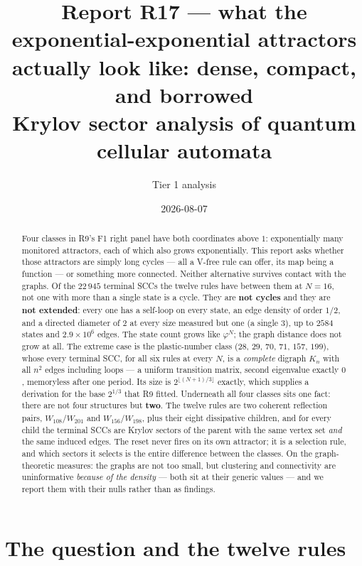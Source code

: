 \documentclass[11pt]{article}
\title{\textbf{Report R17 --- what the exponential-exponential attractors
actually look like: dense, compact, and borrowed}\\
\large Krylov sector analysis of quantum cellular automata}
\author{Tier 1 analysis}
\date{2026-08-07}
\theoremstyle{plain}
\begin{document}
\maketitle

\begin{abstract}
Four classes in R9's F1 right panel have both coordinates above $1$:
exponentially many monitored attractors, each of which also grows
exponentially. This report asks whether those attractors are simply long cycles
--- all a V-free rule can offer, its map being a function --- or something more
connected. Neither alternative survives contact with the graphs. Of the
$22\,945$ terminal SCCs the twelve rules have between them at $N=16$, not one
with more than a single state is a cycle. They are \textbf{not cycles} and they
are \textbf{not extended}: every one has a self-loop on every state, an edge
density of order $1/2$, and a directed diameter of $2$ at every size measured
but one (a single $3$), up to $2584$ states and $2.9\times10^6$ edges. The state count grows like $\varphi^N$; the
graph distance does not grow at all. The extreme case is the plastic-number class
($28$, $29$, $70$, $71$, $157$, $199$), whose every terminal SCC, for all six
rules at every $N$, is a \emph{complete} digraph $K_n$ with all $n^2$ edges
including loops --- a uniform transition matrix, second eigenvalue exactly $0$,
memoryless after one period. Its size is $2^{\lfloor (N+1)/3\rfloor}$ exactly,
which supplies a derivation for the base $2^{1/3}$ that R9 fitted. Underneath
all four classes sits one fact: there are not four structures but \textbf{two}.
The twelve rules are two coherent reflection pairs, $W_{108}/W_{201}$ and
$W_{156}/W_{198}$, plus their eight dissipative children, and for every child
the terminal SCCs are Krylov sectors of the parent with the same vertex set
\emph{and} the same induced edges. The reset never fires on its own attractor;
it is a selection rule, and which sectors it selects is the entire difference
between the classes. On the graph-theoretic measures: the graphs are not too
small, but clustering and connectivity are uninformative \emph{because of the
density} --- both sit at their generic values --- and we report them with their
nulls rather than as findings.
\end{abstract}

\tableofcontents

\section{The question and the twelve rules}
\end{document}
